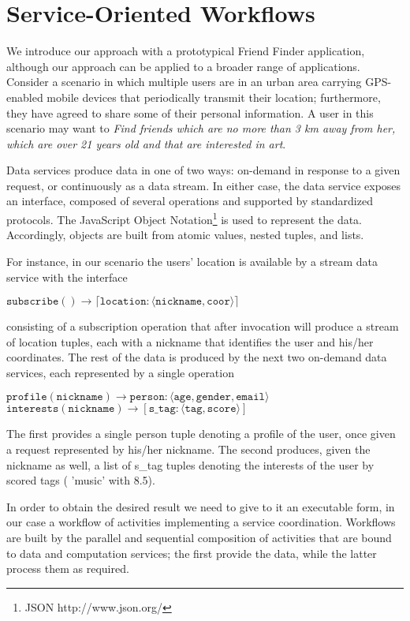 
\section{Service-Oriented Workflows}\label{sec:serviceOrientedWorkflows}

We introduce our approach with a prototypical Friend Finder application, although our approach can be applied to a broader range of applications. Consider a scenario in which multiple users are in an urban area carrying GPS-enabled mobile devices that periodically transmit their location; furthermore, they have agreed to share some of their personal information. A user in this scenario may want to \textit{Find friends which are no more than 3 km away from her, which are over 21 years old and that are interested in art}.
		
Data services produce data in one of two ways: on-demand in response to a given request, or continuously as a data stream. In either case, the data service exposes an interface, composed of several operations and supported by standardized protocols. The JavaScript Object Notation\footnote{JSON http://www.json.org/} is used to represent the data. Accordingly, objects are built from atomic values, nested tuples, and lists.
	
For instance, in our scenario the users' location is available by a stream data service with the interface
	
$\mathtt{subscribe() \rightarrow \lceil location:\langle nickname, coor\rangle\rceil}$
	
consisting of a subscription operation that after invocation will produce a stream of location tuples, each with a nickname that identifies the user and his/her coordinates. The rest of the data is produced by the next two on-demand data services, each represented by a single operation
	
$\mathtt{profile(nickname) \rightarrow person:\langle age, gender, email\rangle}$
\\
$\mathtt{interests(nickname) \rightarrow \left[s\_tag:\langle tag, score\rangle\right]}$
	
	
The first provides a single person tuple denoting a profile of the user, once given a request represented by his/her nickname. The second produces, given the nickname as well, a list of s\_tag tuples denoting the interests of the user by scored tags (\eg{} 'music' with 8.5).
	
In order to obtain the desired result we need to give to it an executable form, in our case a workflow of activities implementing a service coordination. Workflows are built by the parallel and sequential composition of activities that are bound to data and computation services; the first provide the data, while the latter process them as required.

